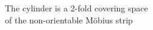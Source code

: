 \documentclass[preview]{standalone}
\begin{document}
\begin{center}
The cylinder is a 2-fold covering space\\of the non-orientable Möbius strip
\end{center}
\end{document}
